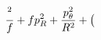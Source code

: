 \documentclass[preview]{standalone}
\begin{document}
\begin{align*}
{^2\over f}+fp_R^2+{p_\theta^2\over R^2}+\big(
\end{align*}
\end{document}

